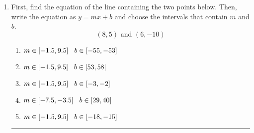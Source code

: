 \documentclass[14pt]{extbook}
\newcommand{\litem}[1]{\item#1\hspace*{-1cm}\rule{\textwidth}{0.4pt}}
\begin{document}
\begin{enumerate}
{\begin{enumerate}[label=\Alph*.]
\end{enumerate} }
\litem{
First, find the equation of the line containing the two points below. Then, write the equation as $ y=mx+b $ and choose the intervals that contain $m$ and $b$.\[ (8, 5) \text{ and } (6, -10) \]\begin{enumerate}[label=\Alph*.]
\item \( m \in [-1.5, 9.5] \hspace*{3mm} b \in [-55, -53] \)
\item \( m \in [-1.5, 9.5] \hspace*{3mm} b \in [53, 58] \)
\item \( m \in [-1.5, 9.5] \hspace*{3mm} b \in [-3, -2] \)
\item \( m \in [-7.5, -3.5] \hspace*{3mm} b \in [29, 40] \)
\item \( m \in [-1.5, 9.5] \hspace*{3mm} b \in [-18, -15] \)

\end{enumerate} }
\end{enumerate}
\end{document}
